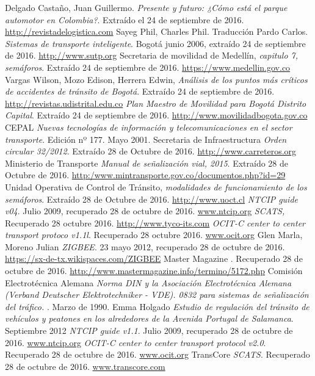 
\def\bibname{Bibliografia}
\begin{thebibliography}{99}
\addcontentsline{toc}{chapter}{\bibname}

  {\sc Delgado Castaño,}  Juan Guillermo.
  \emph{ Presente y futuro: ¿Cómo está el parque automotor en Colombia?}.
  Extraído el 24 de septiembre de 2016.
  \url{http://revistadelogistica.com}
  {\sc Sayeg Phil,} Charles Phil. Traducción Pardo Carlos.
  \emph{Sistemas de transporte inteligente}.
  Bogotá junio 2006, extraído 24 de septiembre de 2016.
  \url{http://www.sutp.org}
  {\sc Secretaria de movilidad de Medellín,} 
  \emph{capitulo 7, semáforos}.
  Extraído 24 de septiembre de 2016.
  \url{https://www.medellin.gov.co}
  {\sc Vargas Wilson, Mozo Edison, Herrera Edwin,} 
  \emph{Análisis de los puntos más críticos de accidentes de tránsito de Bogotá}.
  Extraído 24 de septiembre de 2016.
  \url{http://revistas.udistrital.edu.co}
  {\sc } 
  \emph{Plan Maestro de Movilidad para Bogotá Distrito Capital}.
  Extraído 24 de septiembre de 2016.
  \url{http://www.movilidadbogota.gov.co}
  {\sc CEPAL} 
  \emph{Nuevas tecnologías de información y telecomunicaciones en el sector transporte}.
  Edición nº 177. Mayo 2001.
  {\sc Secretaria de Infraestructura} 
  \emph{Orden circular 32/2012}.
  Extraído 28 de Octubre de 2016.
  \url{http://www.carreteros.org}
  {\sc Ministerio de Transporte} 
  \emph{Manual de señalización vial, 2015}.
  Extraído 28 de Octubre de 2016.
  \url{http:/www.mintransporte.gov.co/documentos.php?id=29}
  {\sc Unidad Operativa de Control de Tránsito,} 
  \emph{modalidades de funcionamiento de los semáforos}.
  Extraído 28 de Octubre de 2016.
  \url{http://www.uoct.cl}
  {\sc } 
  \emph{NTCIP guide v04}.
  Julio 2009, recuperado 28 de octubre de 2016.
  \url{ www.ntcip.org}
  {\sc } 
  \emph{SCATS,}
  Recuperado 28 octubre 2016.
  \url{ http://www.tyco-its.com}
  {\sc } 
  \emph{OCIT-C center to center transport protoco v1.1l}.
  Recuperado 28 octubre 2016.
  \url{ www.ocit.org}
  {\sc  Glen  Marla,}  Moreno Julian
  \emph{ZIGBEE}.
  23 mayo 2012, recuperado 28 de octubre de 2016.
  \url{ https://sx-de-tx.wikispaces.com/ZIGBEE}
  {\sc Master Magazine} 
  \emph{}.
  Recuperado 28 de octubre de 2016.
  \url{ http://www.mastermagazine.info/termino/5172.php}
  {\sc Comisión Electrotécnica Alemana} 
  \emph{Norma DIN y la Asociación Electrotécnica Alemana (Verband Deutscher Elektrotechniker - VDE). 0832 para sistemas de señalización del tráfico. }.
  Marzo de 1990.
  {\sc Emma Holgado} 
  \emph{Estudio de regulación del tránsito de vehículos y peatones en los alrededores de la Avenida Portugal de Salamanca}.
  Septiembre 2012
  {\sc } 
  \emph{NTCIP guide v1.1}.
  Julio 2009, recuperado 28 de octubre de 2016.
  \url{ www.ntcip.org}
  {\sc } 
  \emph{OCIT-C center to center transport protocol v2.0}.
  Recuperado 28 de octubre de 2016.
  \url{ www.ocit.org}
  {\sc TransCore } 
  \emph{SCATS}.
  Recuperado 28 de octubre de 2016.
  \url{ www.transcore.com}

\end{thebibliography}



